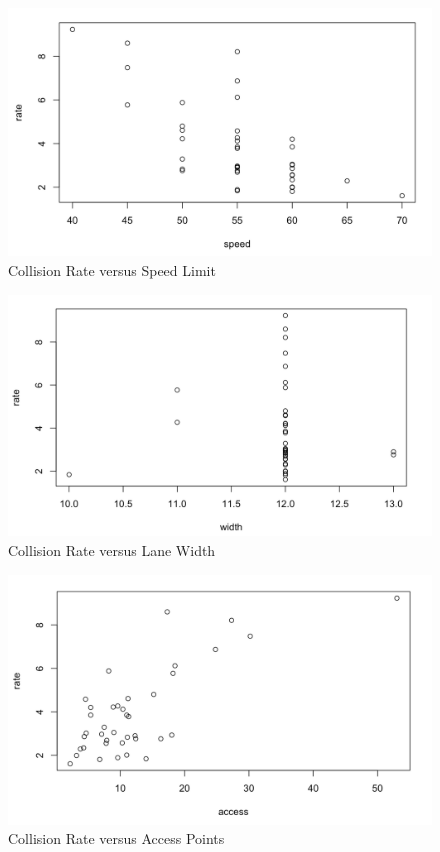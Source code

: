 \documentclass[12pt]{report}
\begin{document}
\begin{figure}[H]
    \centering
    \includegraphics[width=1\textwidth]{Preliminary graphs/ST562 rate vs speed.png}
    \caption{Collision Rate versus Speed Limit} \label{fig:PG3}
\end{figure}
\noindent

\begin{figure}[H]
    \centering
    \includegraphics[width=1\textwidth]{Preliminary graphs/ST562 rate vs width.png}
    \caption{Collision Rate versus Lane Width} \label{fig:PG4}
\end{figure}
\noindent

\begin{figure}[H]
    \centering
    \includegraphics[width=1\textwidth]{Preliminary graphs/ST562 rate vs access.png}
    \caption{Collision Rate versus Access Points} \label{fig:PG5}
\end{figure}
\noindent
\end{document}
